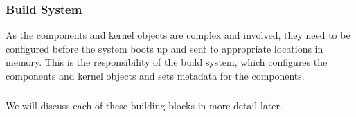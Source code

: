 \documentclass[
	a4paper, %
	11pt, %
	unnumberedsections, %
	twoside, %
]{LTJournalArticle}
\begin{document}
\subsubsection{Build System}
As the components and kernel objects are complex and involved, they need to be configured before the system boots up and sent to appropriate locations in memory. This is the responsibility of the build system, which configures the components and kernel objects and sets metadata for the components.


\subsubsection*{} We will discuss each of these building blocks in more detail later.





\end{document}
